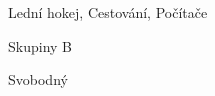 



\begin{cvhonors}

  \cvhonor
    {} %
    {Lední hokej, Cestování, Počítače} %

\end{cvhonors}
\vspace{5pt}



\begin{cvhonors}

  \cvhonor
    {}%
    {Skupiny B} %



\end{cvhonors}
\vspace{5pt}



\begin{cvhonors}

  \cvhonor
    {}%
    {Svobodný} %



\end{cvhonors}
